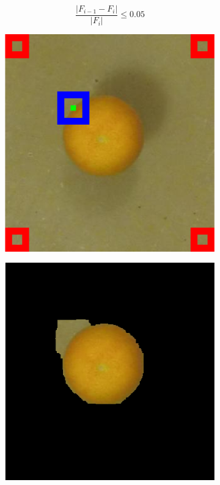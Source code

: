 \documentclass {udthesis}
\begin{document}
%
\begin{equation}
 \label{eqn:seg_threshold}
 \frac{|F_{i-1}-F_{i}|}{|F_i|} \leq 0.05
\end{equation}
%
%
\begin{figure}
  \centering
  \begin{subfigure}[]{0.2\textwidth}
      \includegraphics[width=\textwidth]{distdes_annotation_good_visualattn_seeds}
      \caption{}
      \label{fig:good_seg_visualattn_seeds}
  \end{subfigure}
  \begin{subfigure}[]{0.2\textwidth}
      \includegraphics[width=\textwidth]{distdes_annotation_good_visualattn_segment}

\end{subfigure}
\end{figure}
\end{document}
